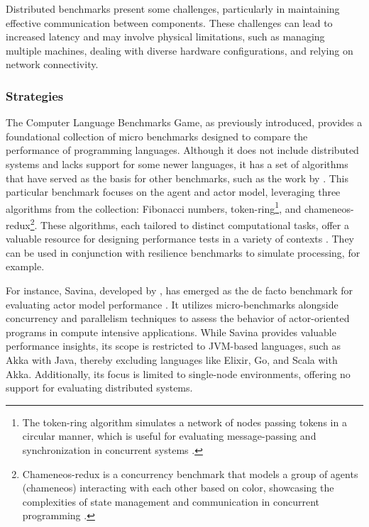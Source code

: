 Distributed benchmarks present some challenges, particularly in maintaining effective communication between components. These challenges can lead to increased latency and may involve physical limitations, such as managing multiple machines, dealing with diverse hardware configurations, and relying on network connectivity.

\subsubsection{Strategies}

The Computer Language Benchmarks Game, as previously introduced, provides a foundational collection of micro benchmarks designed to compare the performance of programming languages. Although it does not include distributed systems and lacks support for some newer languages, it has a set of algorithms that have served as the basis for other benchmarks, such as the work by \textcite{Cardoso2013}. This particular benchmark focuses on the agent and actor model, leveraging three algorithms from the collection: Fibonacci numbers, token-ring\footnote{The token-ring algorithm simulates a network of nodes passing tokens in a circular manner, which is useful for evaluating message-passing and synchronization in concurrent systems \cite{Cardoso2013}.}, and chameneos-redux\footnote{Chameneos-redux is a concurrency benchmark that models a group of agents (chameneos) interacting with each other based on color, showcasing the complexities of state management and communication in concurrent programming \cite{Cardoso2013}.}. These algorithms, each tailored to distinct computational tasks, offer a valuable resource for designing performance tests in a variety of contexts \cite{Cardoso2013,Randtoul2022}. They can be used in conjunction with resilience benchmarks to simulate processing, for example.

For instance, Savina, developed by \textcite{Imam2014}, has emerged as the de facto benchmark for evaluating actor model performance \cite{Blessing2019}. It utilizes micro-benchmarks alongside concurrency and parallelism techniques to assess the behavior of actor-oriented programs in compute intensive applications. While Savina provides valuable performance insights, its scope is restricted to JVM-based languages, such as Akka with Java, thereby excluding languages like Elixir, Go, and Scala with Akka. Additionally, its focus is limited to single-node environments, offering no support for evaluating distributed systems.

